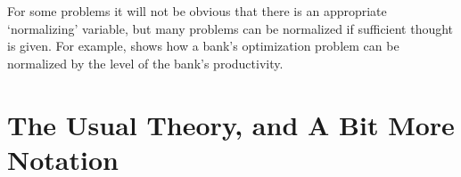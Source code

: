 \documentclass[titlepage, headings=optiontotocandhead]{\econtex}
\begin{document}
For some problems it will not be obvious that there is an appropriate `normalizing' variable, but many problems can be normalized if sufficient thought is given.  For example, \cite{valencia:2006} shows how a bank's optimization problem can be normalized by the level of the bank's productivity.


\hypertarget{The-Usual-Theory}{}
\section{The Usual Theory, and A Bit More Notation}
\label{sec:usualtheory}
\end{document}
